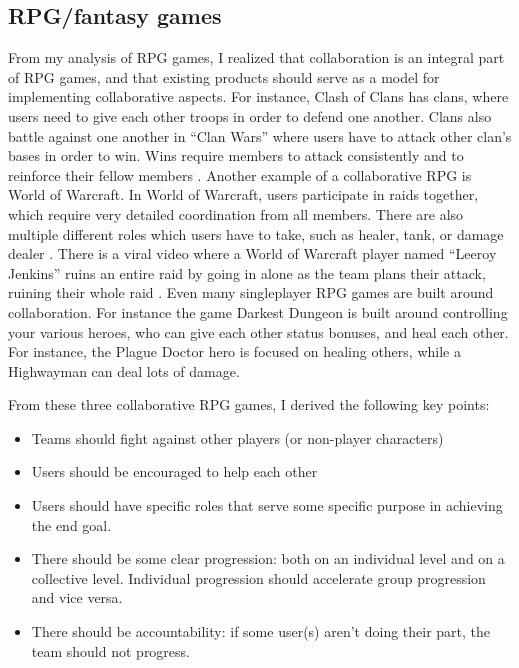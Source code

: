 \documentclass{l4proj}
\begin{document}
\subsection{RPG/fantasy games}
From my analysis of RPG games, I realized that collaboration is an integral part of RPG games, and that existing products should serve as a model for implementing collaborative aspects. For instance, Clash of Clans has clans, where users need to give each other troops in order to defend one another. Clans also battle against one another in ``Clan Wars'' where users have to attack other clan's bases in order to win. Wins require members to attack consistently and to reinforce their fellow members \citep{coc}. 
Another example of a collaborative RPG is World of Warcraft. In World of Warcraft, users participate in raids together, which require very detailed coordination from all members. There are also multiple different roles which users have to take, such as healer, tank, or damage dealer \citep{wow}. There is a viral video where a World of Warcraft player named ``Leeroy Jenkins'' ruins an entire raid by going in alone as the team plans their attack, ruining their whole raid \citep{leeroy_jenkins}. Even many singleplayer RPG games are built around collaboration. For instance the game Darkest Dungeon \citep{darkest_dungeon} is built around controlling your various heroes, who can give each other status bonuses, and heal each other. For instance, the Plague Doctor hero is focused on healing others, while a Highwayman can deal lots of damage. 

From these three collaborative RPG games, I derived the following key points:
\begin{itemize}    
    \item
      Teams should fight against other players (or non-player characters)
    \item
      Users should be encouraged to help each other
    \item
      Users should have specific roles that serve some specific purpose in achieving the end goal.
    \item 
      There should be some clear progression: both on an individual level and on a collective level. Individual progression should accelerate group progression and vice versa.
    \item 
      There should be accountability: if some user(s) aren't doing their part, the team should not progress.
\end{itemize}


\end{document}
